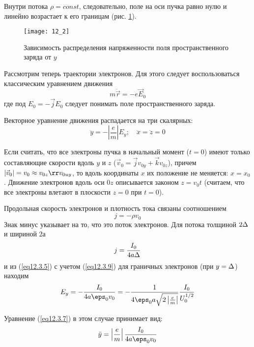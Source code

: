 Внутри потока \( \rho = const \), следовательно, поле на оси пучка равно нулю 
и линейно возрастает к его границам (рис. \ref{img12.2}).

\begin{figure}[h!]
	\center
	\texttt{[image: 12\_2]}
	\caption{Зависимость распределения напряженности поля пространственного
		заряда от \( y \)}
	\label{img12.2}
\end{figure}
 
Рассмотрим теперь траектории электронов. Для этого следует воспользоваться 
классическим уравнением движения
\begin{equation}
	m\ddot{\vec{r}} = -e\vec{E}_0
	\label{eq12.3.6}
\end{equation}
где под \( E_0 = -\vec{j}E_0 \) следует понимать поле пространственного 
заряда. 

Векторное уравнение движения распадается на три скалярных:
\begin{equation}
	\ddot{y} = -\left| \frac{e}{m} \right|E_y; \quad
	\ddot{x} = \ddot{z} = 0
	\label{eq12.3.7}
\end{equation}

Если считать, что все электроны пучка в начальный момент (\( t = 0\)) имеют 
только составляющие  скорости вдоль \( y \) и \( z \) 
(\( \vec{v}_0 = \vec{j}v_{0y} + \vec{k}v_{0z} \)), причем 
\( |\vec{v}_0| = v_0 \approx v_{0z} \rr v_{0uy} \), то вдоль координаты 
\( x \) их положение не меняется: \( x = x_0 \). Движение электронов вдоль оси 
\( 0z \) описывается законом \( z = v_0 t \) (считаем, что все электроны 
влетают в плоскости \( z = 0 \) при \( t = 0 \)).

Продольная скорость электронов и плотность тока связаны соотношением
\begin{equation}
	j = -\rho v_0
	\label{eq12.3.8}
\end{equation}
Знак минус указывает на то, что это поток электронов. Для потока толщиной 
\( 2\Delta \) и шириной \( 2а \)
\begin{equation}
	j = \frac{I_0}{4a\Delta}
	\label{eq12.3.9}
\end{equation}
и из (\ref{eq12.3.5}) с учетом (\ref{eq12.3.9}) для граничных электронов (при 
\( y = \Delta \)) находим
\begin{equation}
	E_y = -\frac{I_0}{4a\eps_0 v_0} = 
		-\frac{1}{4\eps_0 a \sqrt{2\left|\frac{e}{m}\right|}}
		\frac{I_0}{U_0^{1/2}}
	\label{eq12.3.10}
\end{equation}

Уравнение (\ref{eq12.3.7}) в этом случае принимает вид:
\begin{equation}
	\ddot{y} = \left| \frac{e}{m} \right| \frac{I_0}{4a\eps_0 v_0}
	\label{eq12.3.11}
\end{equation}

